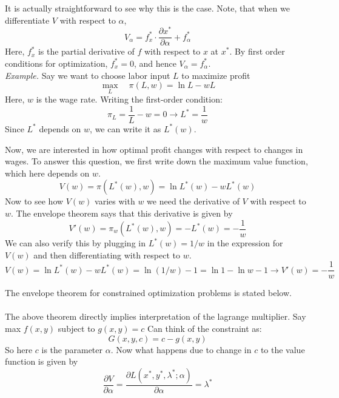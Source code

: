 \documentclass{./../Latex/handout}
\begin{document}
It is actually straightforward to see why this is the case. Note, that when we differentiate $V$ with respect to $\alpha$,
$$ V_{\alpha} = f_x^* \cdot \frac{\partial x^*}{\partial \alpha} + f_{\alpha}^* $$
Here, $f_x^*$ is the partial derivative of $f$ with respect to $x$ at $x^*$. By first order conditions for optimization, $f_x^*=0$, and hence $ V_{\alpha}=f_{\alpha}^* $. \\

\textit{Example.} Say we want to choose labor input $L$ to maximize profit $$\max_L \quad\pi(L, w) = \ln L-wL$$ 
Here, $w$ is the wage rate. Writing the first-order condition:
$$ \pi_L = \frac{1}{L}-w = 0 \rightarrow L^* = \frac{1}{w} $$
Since $L^*$ depends on $w$, we can write it as $L^*(w)$.

Now, we are interested in how optimal profit changes with respect to changes in wages. To answer this question, we first write down the maximum value function, which here depends on $w$. 
$$ V(w) = \pi(L^*(w), w) =  \ln L^*(w)-wL^*(w) $$
Now to see how $V(w)$ varies with $w$ we need the derivative of $V$ with respect to $w$. The envelope theorem says that this derivative is given by
$$ V'(w) =  \pi_w(L^*(w), w) =-L^*(w) = -\frac{1}{w}$$
We can also verify this by plugging in $L^*(w)=1/w$ in the expression for $V(w)$ and then differentiating with respect to $w$.
$$ V(w) =   \ln L^*(w)-wL^*(w) = \ln(1/w)-1 = \ln 1-\ln w-1 \rightarrow V'(w)=-\frac{1}{w}$$ 

The envelope theorem for constrained optimization problems is stated below. \\

 \\

The above theorem directly implies interpretation of the lagrange multiplier. Say max $f(x, y)$ subject to $g(x, y)=c$ 
Can think of the constraint as:
$$ G(x,y,c)= c-g(x,y) $$
So here $c$ is the parameter $\alpha$. Now what happens due to change in $c$ to the value function is given by 
$$
\frac{\partial V}{\partial \alpha}=\frac{\partial L(x^*, y^*, \lambda^*; \alpha)}{\partial \alpha} = \lambda^*$$ \\
\end{document}
